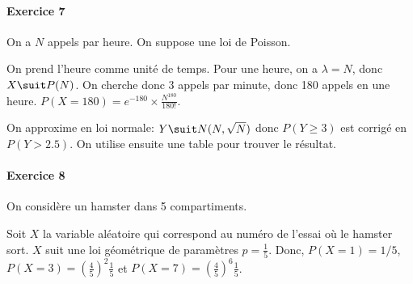\documentclass[10pt,a4paper,french]{article}
\begin{document}
\paragraph{Exercice 7}
On a $N$ appels par heure. On suppose une loi de Poisson.

On prend l'heure comme unité de temps. Pour une heure, on a $\lambda = N$, donc $X \suit P(N)$. On cherche donc 3 appels par minute, donc 180 appels en une heure. $P(X=180)=e^{-180} \times \frac{N^{180}}{180!}$.

On approxime en loi normale: $Y \suit N(N, \sqrt{N})$ donc $P(Y \geq 3)$ est corrigé en $P(Y > 2.5)$. On utilise ensuite une table pour trouver le résultat.

\paragraph{Exercice 8}
On considère un hamster dans 5 compartiments.

Soit $X$ la variable aléatoire qui correspond au numéro de l'essai où le hamster sort. $X$ suit une loi géométrique de paramètres $p = \frac{1}{5}$. Donc, $P(X=1) = 1/5$, $P(X=3) = (\frac{4}{5})^2 \frac{1}{5}$ et $P(X=7) = (\frac{4}{5})^6 \frac{1}{5}$.
\end{document}
